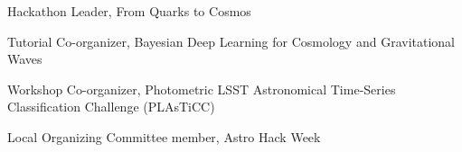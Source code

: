 \documentclass[11pt,letterpaper]{article}
\begin{document}
\nopagebreak\begin{list}{}{\malzlist}
	\item Hackathon Leader, From Quarks to Cosmos 
	\item Tutorial Co-organizer, Bayesian Deep Learning for Cosmology and Gravitational Waves 
	\item Workshop Co-organizer, Photometric LSST Astronomical Time-Series Classification Challenge (PLAsTiCC) 
	\item Local Organizing Committee member, Astro Hack Week 
\end{list}

%
\clearpage



%
\clearpage
\end{document}
